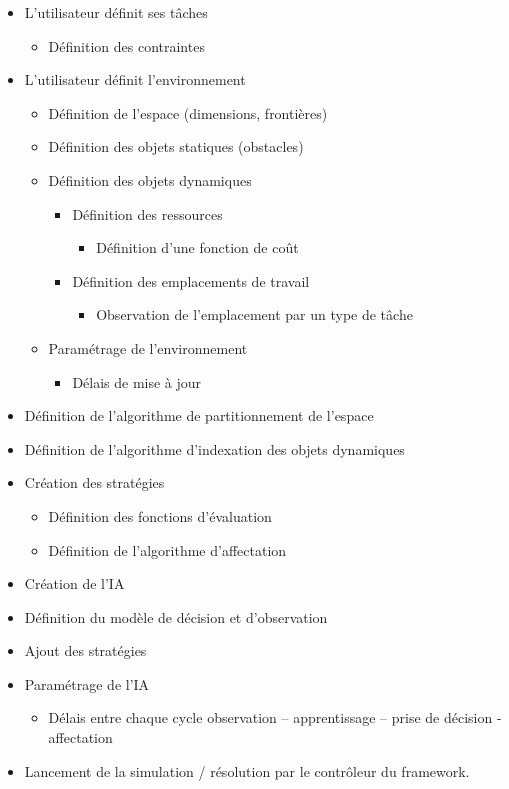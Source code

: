 \renewcommand{\labelitemii}{$\hookrightarrow$}
\renewcommand{\labelitemiii}{$\circ$}
\begin{itemize}
\setlength{\itemsep}{5pt}
\item L'utilisateur définit ses tâches
	\begin{itemize}
	\setlength{\itemsep}{2pt}
	\item Définition des contraintes
	\end{itemize}
\item L'utilisateur définit l'environnement
	\begin{itemize}
	\setlength{\itemsep}{2pt}
	\item Définition de l'espace (dimensions, frontières)
	\item Définition des objets statiques (obstacles)
	\item Définition des objets dynamiques
		\begin{itemize}
		\item Définition des ressources
			\begin{itemize}
			\item Définition d'une fonction de coût
			\end{itemize}
		\item Définition des emplacements de travail
			\begin{itemize}
			\item Observation de l'emplacement par un type de tâche
			\end{itemize}
		\end{itemize}
	\item Paramétrage de l'environnement
		\begin{itemize}
		\item Délais de mise à jour
		\end{itemize}
	\end{itemize}
\item Définition de l'algorithme de partitionnement de l'espace
\item Définition de l'algorithme d'indexation des objets dynamiques	
\item Création des stratégies
	\begin{itemize}
	\setlength{\itemsep}{2pt}
	\item Définition des fonctions d'évaluation
	\item Définition de l'algorithme d'affectation
	\end{itemize}
\item Création de l'IA
\item Définition du modèle de décision et d'observation
\item Ajout des stratégies
\item Paramétrage de l'IA
	\begin{itemize}
	\item Délais entre chaque cycle \og observation – apprentissage – prise de décision - affectation \fg
	\end{itemize}
\item Lancement de la simulation / résolution par le contrôleur du framework.
\end{itemize} %

